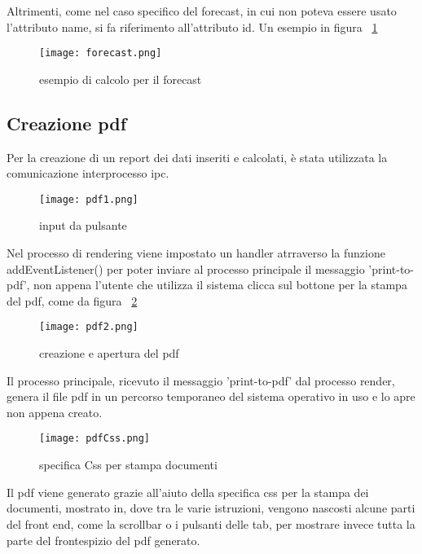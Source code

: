 Altrimenti, come nel caso specifico del forecast, in cui non poteva essere usato l'attributo name, si fa riferimento all'attributo id. Un esempio in figura ~\ref{fig:forecast}

\begin{figure}[H]
    \centering
    \texttt{[image: forecast.png]}
    \caption{esempio di calcolo per il forecast}
    \label{fig:forecast}
\end{figure}


\subsection {Creazione pdf}

Per la creazione di un report dei dati inseriti e calcolati, è stata utilizzata la comunicazione interprocesso \Gls{ipc}. 

\begin{figure}[H]
    \centering
    \texttt{[image: pdf1.png]}
    \caption{input da pulsante}
    \label{fig:pdf1}
\end{figure}

Nel processo di rendering viene impostato un handler atrraverso la funzione addEventListener() per poter inviare al processo principale il messaggio 'print-to-pdf', non appena l'utente che utilizza il sistema clicca sul bottone per la stampa del pdf, come da figura ~\ref{fig:pdf1}

\begin{figure}[H]
    \centering
    \texttt{[image: pdf2.png]}
    \caption{creazione e apertura del pdf}
    \label{fig:pdf2}
\end{figure}

Il processo principale, ricevuto il messaggio 'print-to-pdf' dal processo render, genera il file pdf in un percorso temporaneo del sistema operativo in uso e lo apre non appena creato.

\begin{figure}[H]
    \centering
    \texttt{[image: pdfCss.png]}
    \caption{specifica Css per stampa documenti}
    \label{fig:pdfCss}
\end{figure}

Il pdf viene generato grazie all'aiuto della specifica \Gls{css} per la stampa dei documenti, mostrato in, dove tra le varie istruzioni, vengono nascosti alcune parti del front end, come la scrollbar o i pulsanti delle tab, per mostrare invece tutta la parte del frontespizio del pdf generato.


